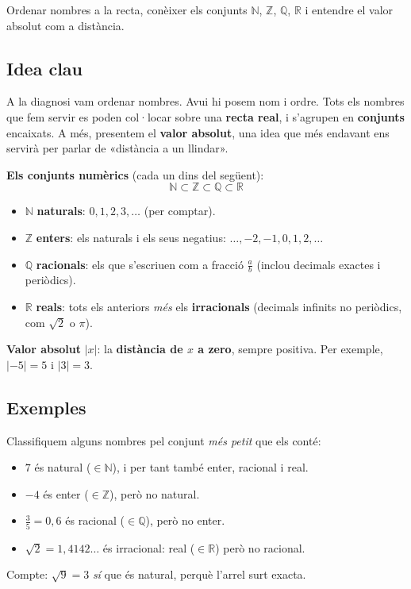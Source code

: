 %
{Ordenar nombres a la recta, conèixer els conjunts $\mathbb{N}$, $\mathbb{Z}$, $\mathbb{Q}$, $\mathbb{R}$ i entendre el valor absolut com a distància.}

\subsection{Idea clau}

A la diagnosi vam ordenar nombres. Avui hi posem nom i ordre. Tots els nombres que
fem servir es poden col·locar sobre una \textbf{recta real}, i s'agrupen en
\textbf{conjunts} encaixats. A més, presentem el \textbf{valor absolut}, una idea que
més endavant ens servirà per parlar de «distància a un llindar».

\begin{idea}
\textbf{Els conjunts numèrics} (cada un dins del següent):
\[
\mathbb{N}\subset\mathbb{Z}\subset\mathbb{Q}\subset\mathbb{R}
\]
\begin{itemize}[leftmargin=1.4em, itemsep=2pt]
  \item $\mathbb{N}$ \textbf{naturals}: $0,1,2,3,\dots$ (per comptar).
  \item $\mathbb{Z}$ \textbf{enters}: els naturals i els seus negatius: $\dots,-2,-1,0,1,2,\dots$
  \item $\mathbb{Q}$ \textbf{racionals}: els que s'escriuen com a fracció $\tfrac{a}{b}$
        (inclou decimals exactes i periòdics).
  \item $\mathbb{R}$ \textbf{reals}: tots els anteriors \emph{més} els
        \textbf{irracionals} (decimals infinits no periòdics, com $\sqrt{2}$ o $\pi$).
\end{itemize}
\textbf{Valor absolut} $|x|$: la \textbf{distància de $x$ a zero}, sempre positiva.
Per exemple, $|{-5}|=5$ i $|3|=3$.
\end{idea}

\subsection{Exemples}

\begin{exemple}
Classifiquem alguns nombres pel conjunt \emph{més petit} que els conté:
\begin{itemize}[leftmargin=1.4em, itemsep=2pt]
  \item $7$ és natural ($\in\mathbb{N}$), i per tant també enter, racional i real.
  \item $-4$ és enter ($\in\mathbb{Z}$), però no natural.
  \item $\tfrac{3}{5}=0,6$ és racional ($\in\mathbb{Q}$), però no enter.
  \item $\sqrt{2}=1,4142\ldots$ és irracional: real ($\in\mathbb{R}$) però no racional.
\end{itemize}
Compte: $\sqrt{9}=3$ \emph{sí} que és natural, perquè l'arrel surt exacta.
\end{exemple}

